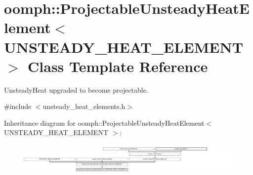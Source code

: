 \hypertarget{classoomph_1_1ProjectableUnsteadyHeatElement}{}\section{oomph\+:\+:Projectable\+Unsteady\+Heat\+Element$<$ U\+N\+S\+T\+E\+A\+D\+Y\+\_\+\+H\+E\+A\+T\+\_\+\+E\+L\+E\+M\+E\+NT $>$ Class Template Reference}
\label{classoomph_1_1ProjectableUnsteadyHeatElement}


Unsteady\+Heat upgraded to become projectable.  




{\ttfamily \#include $<$unsteady\+\_\+heat\+\_\+elements.\+h$>$}

Inheritance diagram for oomph\+:\+:Projectable\+Unsteady\+Heat\+Element$<$ U\+N\+S\+T\+E\+A\+D\+Y\+\_\+\+H\+E\+A\+T\+\_\+\+E\+L\+E\+M\+E\+NT $>$\+:\begin{figure}[H]
\begin{center}
\leavevmode
\includegraphics[height=1.573034cm]{classoomph_1_1ProjectableUnsteadyHeatElement}
\end{center}
\end{figure}
